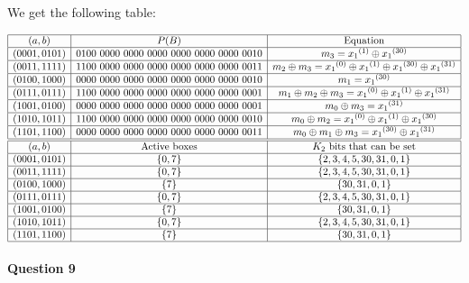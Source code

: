 \documentclass[a4paper]{article}
\begin{document}
We get the following table:

\begin{equation*}
  \begin{array}{|c|c|c|}
    \hline
    (a,b) & P(B) & \text{Equation} \\
    \hline
    (0001,0101) & 0100\ 0000\ 0000\ 0000\ 0000\ 0000\ 0000\ 0010 & m_3 = {x_1}^{(1)} \oplus {x_1}^{(30)} \\
    \hline
    (0011,1111) & 1100\ 0000\ 0000\ 0000\ 0000\ 0000\ 0000\ 0011 & m_2 \oplus m_3 = {x_1}^{(0)} \oplus {x_1}^{(1)} \oplus {x_1}^{(30)} \oplus {x_1}^{(31)} \\
    \hline
    (0100,1000) & 0000\ 0000\ 0000\ 0000\ 0000\ 0000\ 0000\ 0010 & m_1 = {x_1}^{(30)} \\
    \hline
    (0111,0111) & 1100\ 0000\ 0000\ 0000\ 0000\ 0000\ 0000\ 0001 & m_1 \oplus m_2 \oplus m_3 = {x_1}^{(0)} \oplus {x_1}^{(1)} \oplus {x_1}^{(31)} \\
    \hline
    (1001,0100) & 0000\ 0000\ 0000\ 0000\ 0000\ 0000\ 0000\ 0001 & m_0 \oplus m_3 = {x_1}^{(31)} \\
    \hline
    (1010,1011) & 1100\ 0000\ 0000\ 0000\ 0000\ 0000\ 0000\ 0010 & m_0 \oplus m_2 = {x_1}^{(0)} \oplus {x_1}^{(1)} \oplus {x_1}^{(30)} \\
    \hline
    (1101,1100) & 0000\ 0000\ 0000\ 0000\ 0000\ 0000\ 0000\ 0011 & m_0 \oplus m_1 \oplus m_3 = {x_1}^{(30)} \oplus {x_1}^{(31)} \\
    \hline
    \hline
    (a,b) & \text{Active boxes} & K_2 \text{ bits that can be set} \\
    \hline
    (0001,0101) & \{0, 7\} & \{2, 3, 4, 5, 30, 31, 0, 1\} \\
    \hline
    (0011,1111) & \{0, 7\} & \{2, 3, 4, 5, 30, 31, 0, 1\} \\
    \hline
    (0100,1000) & \{7\} & \{30, 31, 0, 1\} \\
    \hline
    (0111,0111) & \{0, 7\} & \{2, 3, 4, 5, 30, 31, 0, 1\} \\
    \hline
    (1001,0100) & \{7\} & \{30, 31, 0, 1\} \\
    \hline
    (1010,1011) & \{0, 7\} & \{2, 3, 4, 5, 30, 31, 0, 1\} \\
    \hline
    (1101,1100) & \{7\} & \{30, 31, 0, 1\}  \\
    \hline
  \end{array}
\end{equation*}

\paragraph{Question 9}
\end{document}
